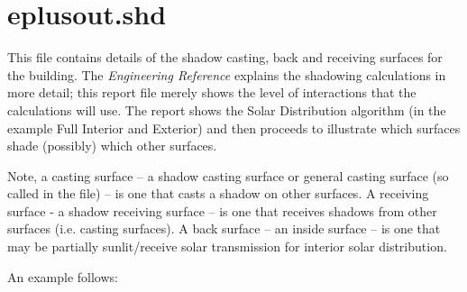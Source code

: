 \section{eplusout.shd}

This file contains details of the shadow casting, back and receiving surfaces for the building. The \emph{Engineering Reference} explains the shadowing calculations in more detail; this report file merely shows the level of interactions that the calculations will use. The report shows the Solar Distribution algorithm (in the example Full Interior and Exterior) and then proceeds to illustrate which surfaces shade (possibly) which other surfaces.

Note, a casting surface -- a shadow casting surface or general casting surface (so called in the file) -- is one that casts a shadow on other surfaces. A receiving surface - a shadow receiving surface -- is one that receives shadows from other surfaces (i.e. casting surfaces). A back surface -- an inside surface -- is one that may be partially sunlit/receive solar transmission for interior solar distribution.

An example follows:

